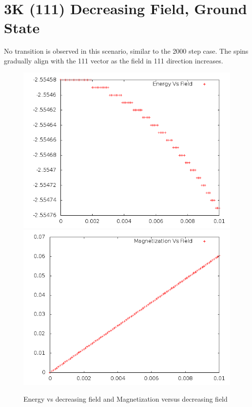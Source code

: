 \documentclass{article}
\begin{document}
\section{3K (111) Decreasing Field, Ground State}
No transition is observed in this scenario, similar to the 2000 step case. The spins gradually align with the 111
vector as the field in 111 direction increases. 
\begin{figure}[h]
 \centering 
\includegraphics[scale=0.3]{111_3000/E005to000G.png}
\includegraphics[scale=0.3]{111_3000/M005to000G.png}
\caption{Energy vs decreasing field and Magnetization versus decreasing field}
\end{figure}
\end{document}
